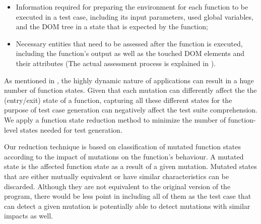 \begin{itemize}[noitemsep]
\item Information required for preparing the environment for each function to be executed in a test case, including its input parameters, used global variables, and the DOM tree in a state that is expected by the function;
\item Necessary entities that need to be assessed after the function is executed, including the function's output as well as the touched DOM elements and their attributes (The actual assessment process is explained in ).
\end{itemize}


As mentioned in , the highly dynamic nature of \javascript applications can result in a huge number of function states. Given that each mutation can differently affect the the (entry/exit) state of  a function, capturing all these different states for the purpose of test case generation can negatively affect the test suite comprehension. 
We apply a function state reduction method to minimize the number of function-level states needed for test generation.

Our reduction technique is based on classification of mutated function states according to the impact of mutations on the function's behaviour. A mutated state is the affected function state as a result of a given mutation. 
Mutated states that are either mutually equivalent or have similar characteristics can be discarded. Although they are not equivalent to the original version of the program, there would be less point in including all of them as the test case that can detect a given mutation is potentially able to detect mutations with similar impacts as well.



